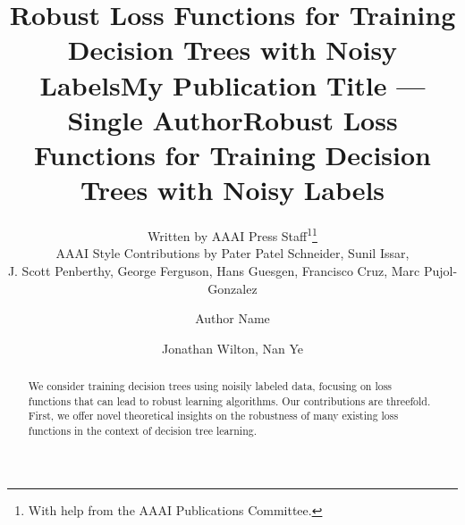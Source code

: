 \documentclass[letterpaper]{article} %
\title{Robust Loss Functions for Training Decision Trees with Noisy Labels}
\author{
    Written by AAAI Press Staff\textsuperscript{\rm 1}\thanks{With help from the AAAI Publications Committee.}\\
    AAAI Style Contributions by Pater Patel Schneider,
    Sunil Issar,\\
    J. Scott Penberthy,
    George Ferguson,
    Hans Guesgen,
    Francisco Cruz\equalcontrib,
    Marc Pujol-Gonzalez\equalcontrib
}
\title{My Publication Title --- Single Author}
\author {
    Author Name
}
\title{Robust Loss Functions for Training Decision Trees with Noisy Labels}
\author {
    Jonathan Wilton,
    Nan Ye
}
\begin{document}
\maketitle

\begin{abstract}
	We consider training decision trees using noisily labeled data, focusing on
	loss functions that can lead to robust learning algorithms.
	Our contributions are threefold.
	First, we offer novel theoretical insights on the robustness of many existing
	loss functions in the context of decision tree learning.

\end{abstract}
\end{document}
